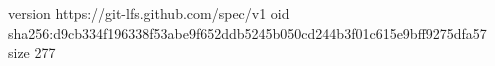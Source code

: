 version https://git-lfs.github.com/spec/v1
oid sha256:d9cb334f196338f53abe9f652ddb5245b050cd244b3f01c615e9bff9275dfa57
size 277

